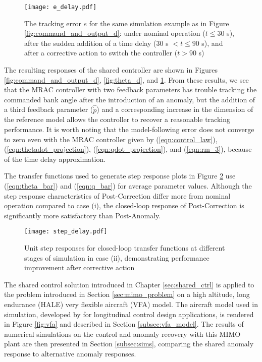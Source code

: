 \begin{figure}[h!]
	\centering
	\texttt{[image: e\_delay.pdf]}
	\caption{The tracking error $e$ for the same simulation example as in Figure \ref{fig:command_and_output_d}: under nominal operation ($t \leq 30$ s), after the sudden addition of a time delay ($30$ s $< t \leq 90$ s), and after a corrective action to switch the controller ($t > 90$ s)}
	\label{fig:error_d}
\end{figure}

The resulting responses of the shared controller are shown in Figures \ref{fig:command_and_output_d}, \ref{fig:theta_d}, and \ref{fig:error_d}. From these results, we see that the MRAC controller with two feedback parameters has trouble tracking the commanded bank angle after the introduction of an anomaly, but the addition of a third feedback parameter ($\hat{\dot{p}}$) and a corresponding increase in the dimension of the reference model allows the controller to recover a reasonable tracking performance. It is worth noting that the model-following error does not converge to zero even with the MRAC controller given by (\ref{eqn:control_law}), (\ref{eqn:thetadot_projection}), (\ref{eqn:qdot_projection}), and (\ref{eqn:rm_3}), because of the time delay approximation. 

The transfer functions used to generate step response plots in Figure \ref{fig:step_delay} use (\ref{eqn:theta_bar}) and (\ref{eqn:q_bar}) for average parameter values. Although the step response characteristics of Post-Correction differ more from nominal operation compared to case (i), the closed-loop response of Post-Correction is significantly more satisfactory than Post-Anomaly.

\begin{figure}[h!]
	\centering
	\texttt{[image: step\_delay.pdf]}
	\caption{Unit step responses for closed-loop transfer functions at different stages of simulation in case (ii), demonstrating performance improvement after corrective action}
	\label{fig:step_delay}
\end{figure}

The shared control solution introduced in Chapter \ref{sec:shared_ctrl} is applied to the problem introduced in Section \ref{sec:mimo_problem} on a high altitude, long endurance (HALE) very flexible aircraft (VFA) model. The aircraft model used in simulation, developed by \cite{gibson2011modeling} for longitudinal control design applications, is rendered in Figure \ref{fig:vfa} and described in Section \ref{subsec:vfa_model}. The results of numerical simulations on the control and anomaly recovery with this MIMO plant are then presented in Section \ref{subsec:sims}, comparing the shared anomaly response to alternative anomaly responses.

